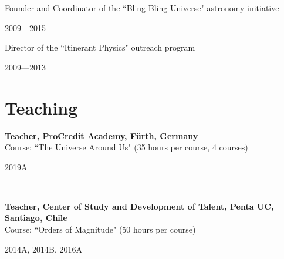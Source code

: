 \documentclass[12pt, a4paper]{article} %
\begin{document}

\begin{minipage}[t]{0.8\textwidth}
\begin{flushleft}%
  \setlength{\leftskip}{0.2cm}%
Founder and Coordinator of the ``Bling Bling Universe" astronomy initiative
\end{flushleft}
\end{minipage}
\begin{minipage}[t]{0.2\textwidth}
\hfill 2009---2015
\end{minipage}


\begin{minipage}[t]{0.7\textwidth}
\begin{flushleft}%
  \setlength{\leftskip}{0.2cm}%
Director of the ``Itinerant Physics" outreach program
\end{flushleft}
\end{minipage}
\begin{minipage}[t]{0.3\textwidth}
\hfill 2009---2013
\end{minipage}

\section*{Teaching}

\begin{minipage}[t]{0.7\textwidth}
\begin{flushleft}%
  \setlength{\leftskip}{0.2cm}%
\textbf{Teacher, ProCredit Academy, F\"urth, Germany}\\
Course: ``The Universe Around Us" (35 hours per course, 4 courses)
\end{flushleft}
\end{minipage}
\begin{minipage}[t]{0.3\textwidth}
\hfill 2019A
\end{minipage}\\

\begin{minipage}[t]{0.7\textwidth}
\begin{flushleft}%
  \setlength{\leftskip}{0.2cm}%
\textbf{Teacher, Center of Study and Development of Talent, Penta UC, Santiago, Chile}\\
Course: ``Orders of Magnitude" (50 hours per course)
\end{flushleft}
\end{minipage}
\begin{minipage}[t]{0.3\textwidth}
\hfill 2014A, 2014B, 2016A
\end{minipage}\\
\end{document}
